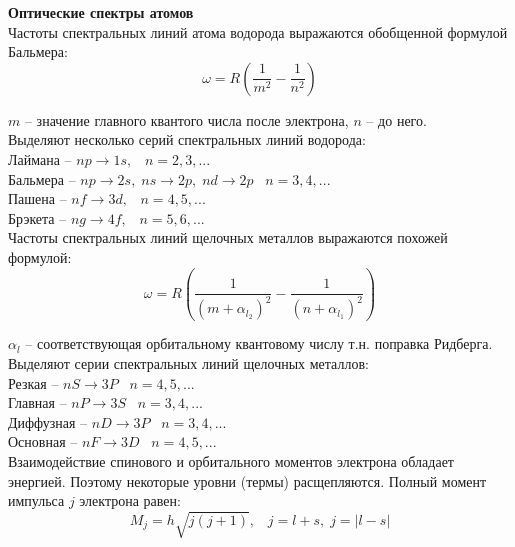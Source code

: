\documentclass{article}
\begin{document}
	\textbf{Оптические спектры атомов}\\

	Частоты спектральных линий атома водорода выражаются обобщенной формулой Бальмера:
	\begin{equation}
		\omega = R(\frac{1}{m^2}-\frac{1}{n^2})
	\end{equation}

	$m$ -- значение главного квантого числа после электрона, $n$ -- до него.\\

	Выделяют несколько серий спектральных линий водорода:\\

	Лаймана -- $np \rightarrow 1s,\;\;\;n=2,3,...$\\

	Бальмера -- $np \rightarrow 2s,\;ns\rightarrow 2p,\;nd\rightarrow 2p\;\;\;n=3,4,...$\\

	Пашена -- $nf \rightarrow 3d,\;\;\;n=4,5,...$\\

	Брэкета -- $ng \rightarrow 4f,\;\;\;n=5,6,...$\\

	Частоты спектральных линий щелочных металлов выражаются похожей формулой:
	\begin{equation}
		\omega = R(\frac{1}{(m+\alpha_{l_2})^2}-\frac{1}{(n+\alpha_{l_1})^2})
	\end{equation}

	$\alpha_l$ -- соответствующая орбитальному квантовому числу т.н. поправка Ридберга.\\

	Выделяют серии спектральных линий щелочных металлов:\\

	Резкая -- $nS \rightarrow 3P\;\;\;n=4,5,...$\\

	Главная -- $nP \rightarrow 3S\;\;\;n=3,4,...$\\

	Диффузная -- $nD \rightarrow 3P\;\;\;n=3,4,...$\\

	Основная -- $nF \rightarrow 3D\;\;\;n=4,5,...$\\

	Взаимодействие спинового и орбитального моментов электрона обладает энергией. Поэтому некоторые уровни (термы) расщепляются. Полный момент импульса $j$ электрона равен:
	\begin{equation}
		M_j = h\sqrt{j(j+1)},\;\;\;j=l+s,\;j=|l-s|
	\end{equation}
\end{document}
